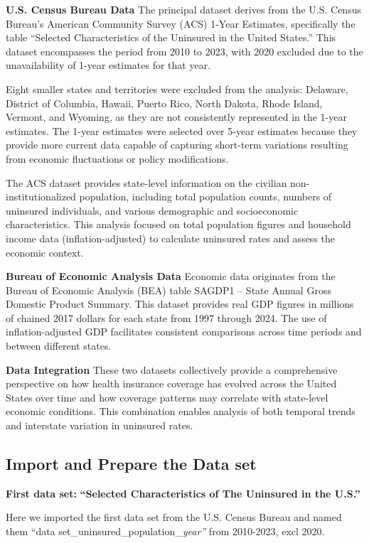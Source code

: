 \documentclass[
]{article}
\begin{document}
\textbf{U.S. Census Bureau Data} The principal dataset derives from the
U.S. Census Bureau's American Community Survey (ACS) 1-Year Estimates,
specifically the table ``Selected Characteristics of the Uninsured in
the United States.'' This dataset encompasses the period from 2010 to
2023, with 2020 excluded due to the unavailability of 1-year estimates
for that year.

Eight smaller states and territories were excluded from the analysis:
Delaware, District of Columbia, Hawaii, Puerto Rico, North Dakota, Rhode
Island, Vermont, and Wyoming, as they are not consistently represented
in the 1-year estimates. The 1-year estimates were selected over 5-year
estimates because they provide more current data capable of capturing
short-term variations resulting from economic fluctuations or policy
modifications.

The ACS dataset provides state-level information on the civilian
non-institutionalized population, including total population counts,
numbers of uninsured individuals, and various demographic and
socioeconomic characteristics. This analysis focused on total population
figures and household income data (inflation-adjusted) to calculate
uninsured rates and assess the economic context.

\textbf{Bureau of Economic Analysis Data} Economic data originates from
the Bureau of Economic Analysis (BEA) table SAGDP1 -- State Annual Gross
Domestic Product Summary. This dataset provides real GDP figures in
millions of chained 2017 dollars for each state from 1997 through 2024.
The use of inflation-adjusted GDP facilitates consistent comparisons
across time periods and between different states.

\textbf{Data Integration} These two datasets collectively provide a
comprehensive perspective on how health insurance coverage has evolved
across the United States over time and how coverage patterns may
correlate with state-level economic conditions. This combination enables
analysis of both temporal trends and interstate variation in uninsured
rates.

\subsection{Import and Prepare the Data
set}\label{import-and-prepare-the-data-set}

\textbf{First data set:} \textbf{``Selected Characteristics of The
Uninsured in the U.S.''}

Here we imported the first data set from the U.S. Census Bureau and
named them ``data set\_uninsured\_population\_\emph{year''} from
2010-2023, excl 2020.
\end{document}
